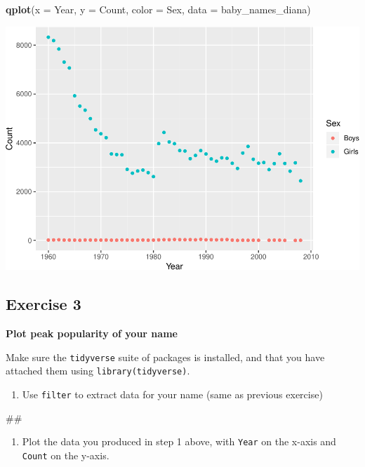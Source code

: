 \documentclass[]{book}
\newenvironment{Shaded}{\begin{snugshade}}{\end{snugshade}}
\newcommand{\KeywordTok}[1]{\textcolor[rgb]{0.13,0.29,0.53}{\textbf{#1}}}
\newcommand{\DataTypeTok}[1]{\textcolor[rgb]{0.13,0.29,0.53}{#1}}
\newcommand{\NormalTok}[1]{#1}
\providecommand{\tightlist}{%
  \setlength{\itemsep}{0pt}\setlength{\parskip}{0pt}}
\begin{document}
\begin{Shaded}
\begin{Highlighting}[]
\KeywordTok{qplot}\NormalTok{(}\DataTypeTok{x =}\NormalTok{ Year, }\DataTypeTok{y =}\NormalTok{ Count, }\DataTypeTok{color =}\NormalTok{ Sex,}
      \DataTypeTok{data =}\NormalTok{ baby_names_diana)}
\end{Highlighting}
\end{Shaded}

\includegraphics{R/Rintro/figures/unnamed-chunk-34-1.pdf}

\subsection{Exercise 3}\label{exercise-3}

\textbf{Plot peak popularity of your name}

Make sure the \texttt{tidyverse} suite of packages is installed, and
that you have attached them using \texttt{library(tidyverse)}.

\begin{enumerate}
\def\labelenumi{\arabic{enumi}.}
\tightlist
\item
  Use \texttt{filter} to extract data for your name (same as previous
  exercise)
\end{enumerate}

\begin{Shaded}
\begin{Highlighting}[]
\NormalTok{##}
\end{Highlighting}
\end{Shaded}

\begin{enumerate}
\def\labelenumi{\arabic{enumi}.}
\setcounter{enumi}{1}
\tightlist
\item
  Plot the data you produced in step 1 above, with \texttt{Year} on the
  x-axis and \texttt{Count} on the y-axis.
\end{enumerate}
\end{document}
